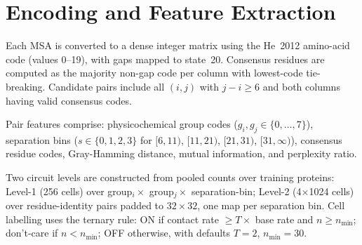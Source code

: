 \section{Encoding and Feature Extraction}
\label{sec:methods-encoding}

Each MSA is converted to a dense integer matrix using the He~2012 amino-acid
code (values 0--19), with gaps mapped to state~20.  Consensus residues are
computed as the majority non-gap code per column with lowest-code tie-breaking.
Candidate pairs include all $(i,j)$ with $j-i \geq 6$ and both columns having
valid consensus codes.

Pair features comprise: physicochemical group codes ($g_i, g_j \in \{0,\ldots,7\}$),
separation bins ($s \in \{0,1,2,3\}$ for $[6,11)$, $[11,21)$, $[21,31)$,
$[31,\infty)$), consensus residue codes, Gray-Hamming distance, mutual
information, and perplexity ratio.

Two circuit levels are constructed from pooled counts over training proteins:
Level-1 (256 cells) over group$_i \times$ group$_j \times$ separation-bin;
Level-2 (4$\times$1024 cells) over residue-identity pairs padded to
$32\times32$, one map per separation bin.  Cell labelling uses the ternary
rule: ON if contact rate $\geq T \times$ base rate and $n \geq n_{\min}$;
don't-care if $n < n_{\min}$; OFF otherwise, with defaults $T=2$,
$n_{\min}=30$.
